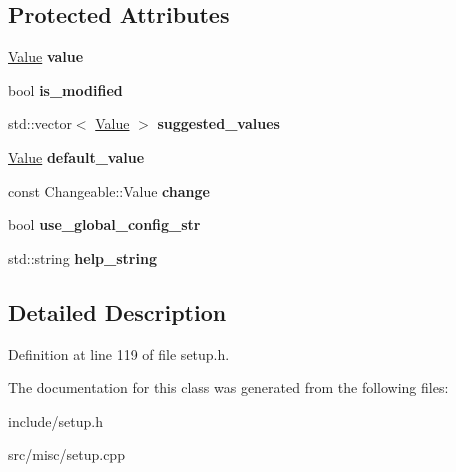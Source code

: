 \subsection*{Protected Attributes}
\begin{DoxyCompactItemize}
\item 
\hypertarget{classProperty_ab9f796553f3beee1cc6a4c4a9d352f28}{\hyperlink{classValue}{Value} {\bfseries value}}\label{classProperty_ab9f796553f3beee1cc6a4c4a9d352f28}

\item 
\hypertarget{classProperty_a478478c72fd7da282d03c652f567bc68}{bool {\bfseries is\-\_\-modified}}\label{classProperty_a478478c72fd7da282d03c652f567bc68}

\item 
\hypertarget{classProperty_a358f5bbc412ec7db0f8ae400eb419d9a}{std\-::vector$<$ \hyperlink{classValue}{Value} $>$ {\bfseries suggested\-\_\-values}}\label{classProperty_a358f5bbc412ec7db0f8ae400eb419d9a}

\item 
\hypertarget{classProperty_adafc47b2053f75c1bb1811bcf7ffdd1a}{\hyperlink{classValue}{Value} {\bfseries default\-\_\-value}}\label{classProperty_adafc47b2053f75c1bb1811bcf7ffdd1a}

\item 
\hypertarget{classProperty_a8a01484c2e7a8cfcf98f01ed3a0fa293}{const Changeable\-::\-Value {\bfseries change}}\label{classProperty_a8a01484c2e7a8cfcf98f01ed3a0fa293}

\item 
\hypertarget{classProperty_abd3b538752e5d6d649dc323ce46591be}{bool {\bfseries use\-\_\-global\-\_\-config\-\_\-str}}\label{classProperty_abd3b538752e5d6d649dc323ce46591be}

\item 
\hypertarget{classProperty_a9a0f13a48b56868da27ec1e33fd0414c}{std\-::string {\bfseries help\-\_\-string}}\label{classProperty_a9a0f13a48b56868da27ec1e33fd0414c}

\end{DoxyCompactItemize}


\subsection{Detailed Description}


Definition at line 119 of file setup.\-h.



The documentation for this class was generated from the following files\-:\begin{DoxyCompactItemize}
\item 
include/setup.\-h\item 
src/misc/setup.\-cpp\end{DoxyCompactItemize}
